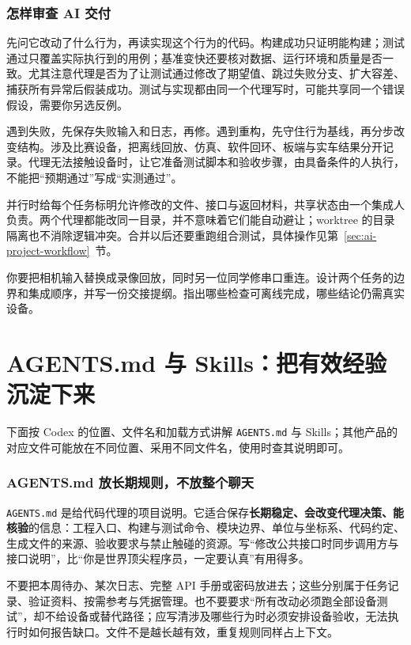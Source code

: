 \subsubsection{怎样审查 AI 交付}
先问它改动了什么行为，再读实现这个行为的代码。构建成功只证明能构建；测试通过只覆盖实际执行到的用例；基准变快还要核对数据、运行环境和质量是否一致。尤其注意代理是否为了让测试通过修改了期望值、跳过失败分支、扩大容差、捕获所有异常后假装成功。测试与实现都由同一个代理写时，可能共享同一个错误假设，需要你另选反例。

遇到失败，先保存失败输入和日志，再修。遇到重构，先守住行为基线，再分步改变结构。涉及比赛设备，把离线回放、仿真、软件回环、板端与实车结果分开记录。代理无法接触设备时，让它准备测试脚本和验收步骤，由具备条件的人执行，不能把“预期通过”写成“实测通过”。

并行时给每个任务标明允许修改的文件、接口与返回材料，共享状态由一个集成人负责。两个代理都能改同一目录，并不意味着它们能自动避让；worktree 的目录隔离也不消除逻辑冲突。合并以后还要重跑组合测试，具体操作见第~\ref{sec:ai-project-workflow}~节。

\begin{exercise}\label{ex:ai-management}
你要把相机输入替换成录像回放，同时另一位同学修串口重连。设计两个任务的边界和集成顺序，并写一份交接提纲。指出哪些检查可离线完成，哪些结论仍需真实设备。
\end{exercise}

\section{AGENTS.md 与 Skills：把有效经验沉淀下来}
\label{sec:ai-rules-skills}

下面按 Codex 的位置、文件名和加载方式讲解 \texttt{AGENTS.md} 与 Skills；其他产品的对应文件可能放在不同位置、采用不同文件名，使用时查其说明即可。

\subsubsection{AGENTS.md 放长期规则，不放整个聊天}
\texttt{AGENTS.md} 是给代码代理的项目说明。它适合保存\textbf{长期稳定、会改变代理决策、能核验}的信息：工程入口、构建与测试命令、模块边界、单位与坐标系、代码约定、生成文件的来源、验收要求与禁止触碰的资源。写“修改公共接口时同步调用方与接口说明”，比“你是世界顶尖程序员，一定要认真”有用得多。

不要把本周待办、某次日志、完整 API 手册或密码放进去；这些分别属于任务记录、验证资料、按需参考与凭据管理。也不要要求“所有改动必须跑全部设备测试”，却不给设备或替代路径；应写清涉及哪些行为时必须安排设备验收，无法执行时如何报告缺口。文件不是越长越有效，重复规则同样占上下文。

